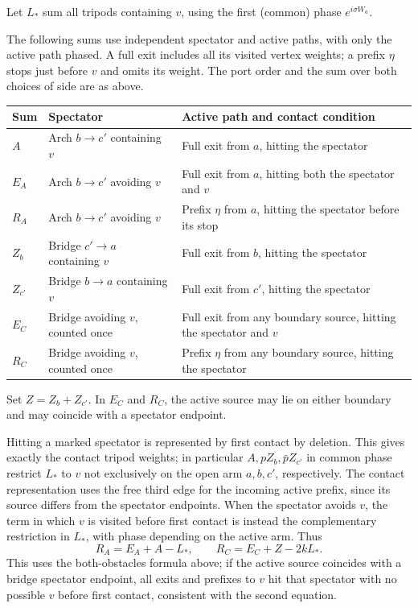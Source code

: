 Let \(L_*\) sum all tripods containing \(v\), using the first (common) phase \(e^{i\sigma W_a}\).

The following sums use independent spectator and active paths, with
only the active path phased. A full exit includes all its visited
vertex weights; a prefix $\eta$ stops just before $v$ and omits its
weight. The port order and the sum over both choices of side are as
above.
\begin{center}
\small
\renewcommand{\arraystretch}{1.15}
\begin{tabular}{@{}p{}p{}p{}@{}}
\toprule
Sum & Spectator & Active path and contact condition\\
\midrule
$A$ & Arch $b\to c'$ containing $v$
 & Full exit from $a$, hitting the spectator\\
$E_A$ & Arch $b\to c'$ avoiding $v$
 & Full exit from $a$, hitting both the spectator and $v$\\
$R_A$ & Arch $b\to c'$ avoiding $v$
 & Prefix $\eta$ from $a$, hitting the spectator before its stop\\
\midrule
$Z_b$ & Bridge $c'\to a$ containing $v$
 & Full exit from $b$, hitting the spectator\\
$Z_{c'}$ & Bridge $b\to a$ containing $v$
 & Full exit from $c'$, hitting the spectator\\
\midrule
$E_C$ & Bridge avoiding $v$, counted once
 & Full exit from any boundary source, hitting the spectator and $v$\\
$R_C$ & Bridge avoiding $v$, counted once
 & Prefix $\eta$ from any boundary source, hitting the spectator\\
\bottomrule
\end{tabular}
\end{center}
Set $Z=Z_b+Z_{c'}$. In $E_C$ and $R_C$, the active source may lie
on either boundary and may coincide with a spectator endpoint.

Hitting a marked spectator is represented by first contact by deletion. This gives exactly the contact tripod weights; in particular \(A,p Z_b,\bar p Z_{c'}\) in common phase restrict \(L_*\) to \(v\) not exclusively on the open arm \(a,b,c'\), respectively. The contact representation uses the free third edge for the incoming active prefix, since its source differs from the spectator endpoints. When the spectator avoids \(v\), the term in which \(v\) is visited before first contact is instead the complementary restriction in \(L_*\), with phase depending on the active arm. Thus
\[
 R_A=E_A+A-L_*,\qquad R_C=E_C+Z-2k L_*.
\]
This uses the both-obstacles formula above; if the active source coincides with a bridge spectator endpoint, all exits and prefixes to \(v\) hit that spectator with no possible \(v\) before first contact, consistent with the second equation.

